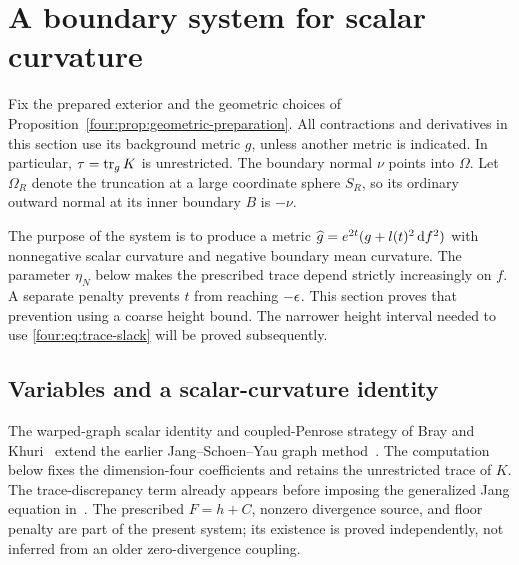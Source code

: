 \section{A boundary system for scalar curvature}
\label{four:sec:system}

Fix the prepared exterior and the geometric choices of
Proposition~\ref{four:prop:geometric-preparation}.  All contractions and
derivatives in this section use its background metric $g$, unless another
metric is indicated.  In particular, $\tau=\operatorname{tr}_gK$ is unrestricted.
The boundary normal $\nu$ points into $\Omega$.  Let $\Omega_R$ denote
the truncation at a large coordinate sphere $S_R$, so its ordinary outward
normal at its inner boundary $B$ is $-\nu$.

The purpose of the system is to produce a metric
$\widehat g=e^{2t}(g+l(t)^2\,\mathrm d f^2)$ with nonnegative scalar curvature and
negative boundary mean curvature.  The parameter $\eta_N$ below makes
the prescribed trace depend strictly increasingly on $f$.  A separate penalty prevents
$t$ from reaching $-\epsilon$.  This section proves that prevention using a
coarse height bound.  The narrower height interval needed to use
\eqref{four:eq:trace-slack} will be proved subsequently.

\subsection{Variables and a scalar-curvature identity}

The warped-graph scalar identity and coupled-Penrose strategy of Bray
and Khuri~\cite{BrayKhuri2010,BrayKhuri2011} extend the earlier
Jang--Schoen--Yau graph method~\cite{Jang1978,SchoenYau1981}.
The computation below fixes the dimension-four coefficients and
retains the unrestricted trace of $K$. The trace-discrepancy term
already appears before imposing the generalized Jang equation
in~\cite[Identity~9, p.~580]{BrayKhuri2011}. The prescribed $F=h+C$,
nonzero divergence source, and floor penalty are part of the
present system; its existence is proved independently, not inferred
from an older zero-divergence coupling.


